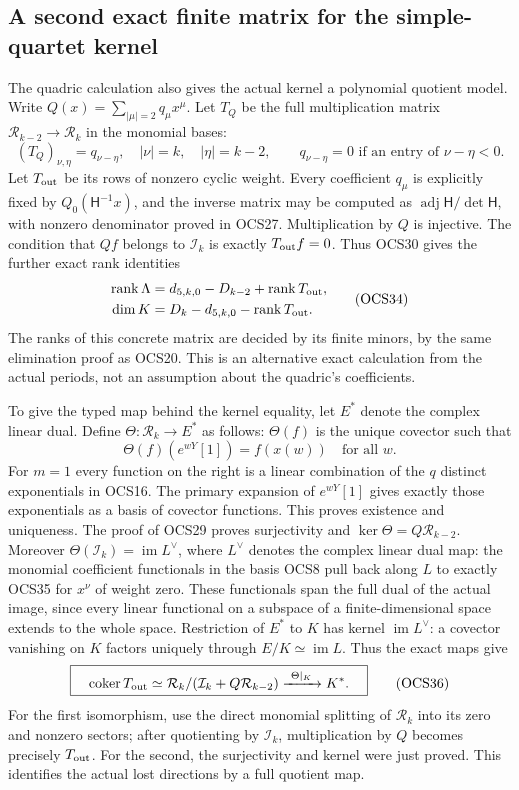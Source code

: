 \documentclass[11pt,a4paper]{article}
\begin{document}
\subsection{A second exact finite matrix for the simple-quartet kernel}
The quadric calculation also gives the actual kernel a
polynomial quotient model. Write $Q(x)=\sum_{|\mu|=2}q_\mu x^\mu$.
Let $T_Q$ be the full multiplication matrix
$\mathcal R_{k-2}\to\mathcal R_k$ in the monomial bases:
\[
 (T_Q)_{\nu,\eta}=q_{\nu-\eta},
 \quad |\nu|=k,\quad|\eta|=k-2,
 \qquad q_{\nu-\eta}=0\text{ if an entry of }\nu-\eta<0.
\]
Let $T_{\rm out}$ be its rows of nonzero cyclic weight.
Every coefficient $q_\mu$ is explicitly fixed by
$Q_0(\mathsf H^{-1}x)$, and the inverse matrix may be
computed as $\operatorname{adj}\mathsf H/\det\mathsf H$,
with nonzero denominator proved in OCS27. Multiplication
by $Q$ is injective. The condition that $Qf$ belongs
to $\mathcal I_k$ is exactly $T_{\rm out}f=0$.
Thus OCS30 gives the further exact rank identities
\[
 \begin{split}
 \operatorname{rank}\Lambda
   &=d_{5,k,0}-D_{k-2}+\operatorname{rank}T_{\rm out},\\
 \dim K&=D_k-d_{5,k,0}-\operatorname{rank}T_{\rm out}.
 \end{split}\tag{OCS34}
\]
The ranks of this concrete matrix are decided by its finite
minors, by the same elimination proof as OCS20. This is
an alternative exact calculation from the actual periods,
not an assumption about the quadric's coefficients.

To give the typed map behind the kernel equality, let
$E^*$ denote the complex linear dual. Define
$\Theta:\mathcal R_k\to E^*$ as follows: $\Theta(f)$ is
the unique covector such that
\[
 \Theta(f)(e^{wY}[1])=f(x(w))\quad\text{for all }w.
 \tag{OCS35}
\]
For $m=1$ every function on the right is a linear
combination of the $q$ distinct exponentials in OCS16.
The primary expansion of $e^{wY}[1]$ gives exactly those
exponentials as a basis of covector functions. This proves
existence and uniqueness. The proof of OCS29 proves
surjectivity and $\ker\Theta=Q\mathcal R_{k-2}$.
Moreover $\Theta(\mathcal I_k)=\operatorname{im}L^\vee$,
where $L^\vee$ denotes the complex linear dual map:
the monomial coefficient functionals in the basis OCS8
pull back along $L$ to exactly OCS35 for $x^\nu$ of
weight zero. These functionals span the full dual of
the actual image, since every linear functional on a
subspace of a finite-dimensional space extends to the
whole space. Restriction of $E^*$ to $K$ has kernel
$\operatorname{im}L^\vee$: a covector vanishing on $K$
factors uniquely through $E/K\simeq\operatorname{im}L$.
Thus the exact maps give
\[
 \boxed{\quad
 \operatorname{coker}T_{\rm out}
 \simeq\mathcal R_k/(\mathcal I_k+Q\mathcal R_{k-2})
 \xrightarrow{\ \Theta|_K\ }K^*.
 \quad}\tag{OCS36}
\]
For the first isomorphism, use the direct monomial splitting
of $\mathcal R_k$ into its zero and nonzero sectors; after
quotienting by $\mathcal I_k$, multiplication by $Q$
becomes precisely $T_{\rm out}$. For the second, the
surjectivity and kernel were just proved. This identifies
the actual lost directions by a full quotient map.
\end{document}
